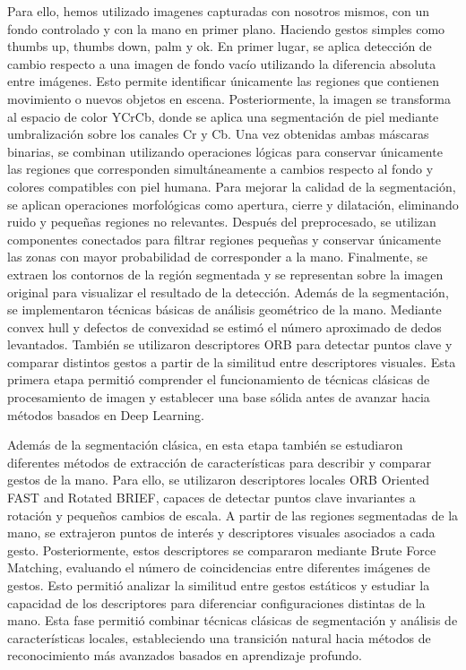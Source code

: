 \documentclass[10pt,a4paper,twocolumn,twoside]{article}
\begin{document}
Para ello, hemos utilizado imagenes capturadas con nosotros mismos, con un fondo controlado y con la mano en primer plano. Haciendo gestos simples como thumbs up, thumbs down, palm y ok.
En primer lugar, se aplica detección de cambio respecto a una imagen de fondo vacío utilizando la diferencia absoluta entre imágenes. Esto permite identificar únicamente las regiones que contienen movimiento o nuevos objetos en escena. Posteriormente, la imagen se transforma al espacio de color YCrCb, donde se aplica una segmentación de piel mediante umbralización sobre los canales Cr y Cb.
Una vez obtenidas ambas máscaras binarias, se combinan utilizando operaciones lógicas para conservar únicamente las regiones que corresponden simultáneamente a cambios respecto al fondo y colores compatibles con piel humana. Para mejorar la calidad de la segmentación, se aplican operaciones morfológicas como apertura, cierre y dilatación, eliminando ruido y pequeñas regiones no relevantes.
Después del preprocesado, se utilizan componentes conectados para filtrar regiones pequeñas y conservar únicamente las zonas con mayor probabilidad de corresponder a la mano. Finalmente, se extraen los contornos de la región segmentada y se representan sobre la imagen original para visualizar el resultado de la detección.
Además de la segmentación, se implementaron técnicas básicas de análisis geométrico de la mano. Mediante convex hull y defectos de convexidad se estimó el número aproximado de dedos levantados. También se utilizaron descriptores ORB para detectar puntos clave y comparar distintos gestos a partir de la similitud entre descriptores visuales.
Esta primera etapa permitió comprender el funcionamiento de técnicas clásicas de procesamiento de imagen y establecer una base sólida antes de avanzar hacia métodos basados en Deep Learning.

Además de la segmentación clásica, en esta etapa también se estudiaron diferentes métodos de extracción de características para describir y comparar gestos de la mano. Para ello, se utilizaron descriptores locales ORB Oriented FAST and Rotated BRIEF, capaces de detectar puntos clave invariantes a rotación y pequeños cambios de escala.
A partir de las regiones segmentadas de la mano, se extrajeron puntos de interés y descriptores visuales asociados a cada gesto. Posteriormente, estos descriptores se compararon mediante Brute Force Matching, evaluando el número de coincidencias entre diferentes imágenes de gestos. Esto permitió analizar la similitud entre gestos estáticos y estudiar la capacidad de los descriptores para diferenciar configuraciones distintas de la mano.
Esta fase permitió combinar técnicas clásicas de segmentación y análisis de características locales, estableciendo una transición natural hacia métodos de reconocimiento más avanzados basados en aprendizaje profundo.
\end{document}
